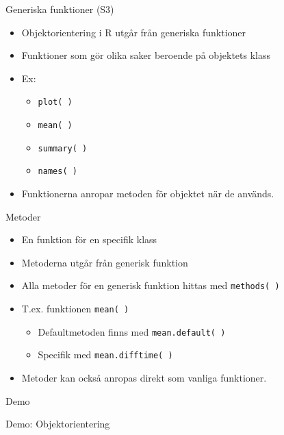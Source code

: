 \documentclass[
  11pt,
  ignorenonframetext,
  handout]{beamer}
\providecommand{\tightlist}{%
  \setlength{\itemsep}{0pt}\setlength{\parskip}{0pt}}
\begin{document}
\begin{frame}{Generiska funktioner (S3)}
\label{generiska-funktioner-s3}
\begin{itemize}
\tightlist
\item
  Objektorientering i R utgår från generiska funktioner
\item
  Funktioner som gör olika saker beroende på objektets klass
\item
  Ex:

  \begin{itemize}
  \tightlist
  \item
    \texttt{plot( )}
  \item
    \texttt{mean( )}
  \item
    \texttt{summary( )}
  \item
    \texttt{names( )}
  \end{itemize}
\item
  Funktionerna anropar metoden för objektet när de används.
\end{itemize}
\end{frame}

\begin{frame}{Metoder}
\label{metoder}
\begin{itemize}
\tightlist
\item
  En funktion för en specifik klass
\item
  Metoderna utgår från generisk funktion
\item
  Alla metoder för en generisk funktion hittas med \texttt{methods( )}
\item
  T.ex. funktionen \texttt{mean( )}

  \begin{itemize}
  \tightlist
  \item
    Defaultmetoden finns med \texttt{mean.default( )}
  \item
    Specifik med \texttt{mean.difftime( )}
  \end{itemize}
\item
  Metoder kan också anropas direkt som vanliga funktioner.
\end{itemize}
\end{frame}

\begin{frame}{Demo}
\label{demo}
\begin{block}{Demo: Objektorientering}
\label{demo-objektorientering}
\end{block}
\end{frame}
\end{document}

